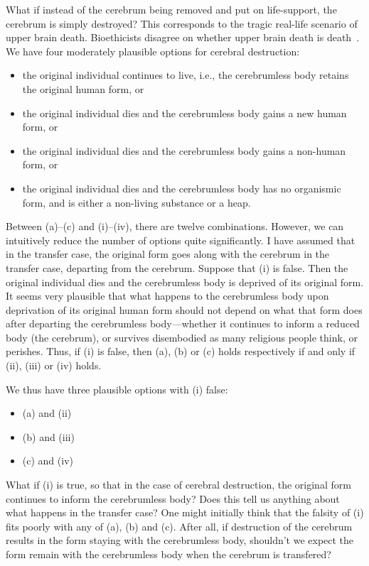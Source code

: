 What if instead of the cerebrum being removed and put on life-support, the cerebrum is simply destroyed? This corresponds
to the tragic real-life scenario of upper brain death. Bioethicists disagree on whether upper brain death is death~\parencite{TruogDeath,NapierDeath}.
We have four moderately plausible options for cerebral destruction:
\begin{itemize}
\item[(i)] the original individual continues to live, i.e., the cerebrumless body retains the original human form, or
\item[(ii)] the original individual dies and the cerebrumless body gains a new human form, or
\item[(iii)] the original individual dies and the cerebrumless body gains a non-human form, or
\item[(iv)] the original individual dies and the cerebrumless body has no organismic form, and is either a non-living substance or a heap.
\end{itemize}

Between (a)--(c) and (i)--(iv), there are twelve combinations. 
However, we can intuitively reduce the number of options quite significantly. I have assumed that in the transfer
case, the original form goes along with the cerebrum in the transfer case, departing from the cerebrum. Suppose that
(i) is false. Then the original individual dies and the cerebrumless body is deprived of its original form. It seems
very plausible that what happens to the cerebrumless body upon deprivation of its original human form should not depend
on what that form does after departing the cerebrumless body---whether it continues to inform a reduced body (the cerebrum), 
or survives disembodied as many religious people think, or perishes. Thus, if (i) is false, then (a), (b) or (c) holds
respectively if and only if (ii), (iii) or (iv) holds. 

We thus have three plausible options with (i) false:
\begin{itemize}
\item[($\alpha$)] (a) and (ii)
\item[($\beta$)] (b) and (iii)
\item[($\gamma$)] (c) and (iv)
\end{itemize}

What if (i) is true, so that in the case of cerebral destruction, the original form continues to inform the cerebrumless body? 
Does this  tell us anything about what happens in the transfer case? One might initially think that the falsity of (i) fits
poorly with any of (a), (b) and (c). After all, if destruction of the cerebrum results in the form staying with the cerebrumless
body, shouldn't we expect the form remain with the cerebrumless body when the cerebrum is transfered?

